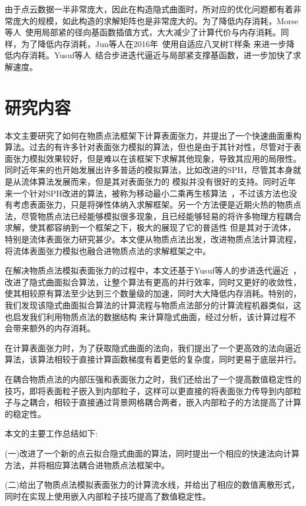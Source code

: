 由于点云数据一半非常庞大，因此在构造隐式曲面时，所对应的优化问题都有着非常庞大的规模，如此构造的求解矩阵也是非常庞大的。为了降低内存消耗，Morse等人~\cite{morse2005interpolating}使用局部紧的径向基函数插值方式，大大减少了计算代价与内存消耗。同样，为了降低内存消耗，Jun等人在2016年~\cite{wang2010adaptive}使用自适应八叉树T样条
来进一步降低内存消耗。Yusuf等人~\cite{hamza2020implicit}结合步进迭代逼近与局部紧支撑基函数，进一步加快了求解速度。
\section{研究内容}
本文主要研究了如何在物质点法框架下计算表面张力，并提出了一个快速曲面重构算法。过去的有许多针对表面张力模拟的算法，但也是由于其针对性，尽管对于表面张力模拟效果较好，但是难以在该框架下求解其他现象，导致其应用的局限性。同时近年来的也开始发展出许多普适的模拟算法，比如改进的SPH，尽管其本身就是从流体算法发展而来，但是其对表面张力的
模拟并没有很好的支持。同时近年来一个针对SPH改进的算法，被称为移动最小二乘再生核算法~\cite{chen2020moving}，不过该方法也没有考虑表面张力，只是将弹性体纳入求解框架。另一个方法便是近期火热的物质点法，尽管物质点法已经能够模拟很多现象，且已经能够轻易的将许多物理方程耦合求解，使其都容纳到一个框架之下，极大的展现了它的普适性
但是其对于流体，特别是流体表面张力研究甚少。本文便从物质点法出发，改进物质点法计算流程，将流体表面张力模拟也融合进物质点法的求解框架之中。

在解决物质点法模拟表面张力的过程中，本文还基于Yusuf等人的步进迭代逼近~\cite{hamza2020implicit}，改进了隐式曲面拟合算法，让整个算法有更高的并行效率，同时又更好的收敛性，使其相较原有算法至少达到三个数量级的加速，同时大大降低内存消耗。特别的，我们发现该隐式曲面拟合算法的计算流程与物质点法部分的计算流程机器类似，这也启发我们利用物质点法的数据结构
来计算隐式曲面，经过分析，该计算过程不会带来额外的内存消耗。

在计算表面张力时，为了获取隐式曲面的法向，我们提出了一个更高效的法向逼近算法，该算法相较于直接计算函数梯度有着更低的复杂度，同时更易于底层并行。

在耦合物质点法的内部压强和表面张力之时，我们还给出了一个提高数值稳定性的技巧，即将表面粒子嵌入到内部粒子，这样可以更直接的将表面张力传导到内部粒子与之耦合，相较于直接通过背景网格耦合两者，嵌入内部粒子的方法提高了计算的稳定性。

本文的主要工作总结如下:

(一)改进了一个新的点云拟合隐式曲面的算法，同时提出一个相应的快速法向计算方法，并将相应算法耦合进物质点法框架中。

(二)给出了物质点法模拟表面张力的计算流水线，并给出了相应的数值离散形式，同时在实现上使用嵌入内部粒子技巧提高了数值稳定性。

